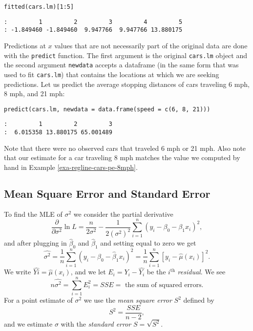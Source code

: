 \begin{verbatim}
fitted(cars.lm)[1:5]
\end{verbatim}

\begin{verbatim}
:         1         2         3         4         5 
: -1.849460 -1.849460  9.947766  9.947766 13.880175
\end{verbatim}

Predictions at \(x\) values that are not necessarily part of the
original data are done with the \texttt{predict} function. The first argument
is the original \texttt{cars.lm} object and the second argument \texttt{newdata}
accepts a dataframe (in the same form that was used to fit \texttt{cars.lm})
that contains the locations at which we are seeking predictions. Let
us predict the average stopping distances of cars traveling 6 mph, 8
mph, and 21 mph:

\begin{verbatim}
predict(cars.lm, newdata = data.frame(speed = c(6, 8, 21)))
\end{verbatim}

\begin{verbatim}
:         1         2         3 
:  6.015358 13.880175 65.001489
\end{verbatim}

Note that there were no observed cars that traveled 6 mph or 21
mph. Also note that our estimate for a car traveling 8 mph matches the
value we computed by hand in Example \ref{exa-regline-cars-pe-8mph}.

\subsection{Mean Square Error and Standard Error}
\label{sec-11-2-3}

To find the MLE of \(\sigma^{2}\) we consider the partial derivative
\begin{equation}
\frac{\partial}{\partial\sigma^{2}}\ln L=\frac{n}{2\sigma^{2}}-\frac{1}{2(\sigma^{2})^{2}}\sum_{i=1}^{n}(y_{i}-\beta_{0}-\beta_{1}x_{i})^{2},
\end{equation}
and after plugging in \(\hat{\beta}_{0}\) and \(\hat{\beta}_{1}\) and
setting equal to zero we get
\begin{equation}
\hat{\sigma^{2}}=\frac{1}{n}\sum_{i=1}^{n}(y_{i}-\hat{\beta}_{0}-\hat{\beta}_{1}x_{i})^{2}=\frac{1}{n}\sum_{i=1}^{n}[y_{i}-\hat{\mu}(x_{i})]^{2}.
\end{equation}
We write \(\hat{Yi}=\hat{\mu}(x_{i})\), and we let
\(E_{i}=Y_{i}-\hat{Y_{i}}\) be the \(i^{\mathrm{th}}\) \emph{residual}. We
see
\begin{equation}
n\hat{\sigma^{2}}=\sum_{i=1}^{n}E_{i}^{2}=SSE=\mbox{ the sum of squared errors.}
\end{equation}
For a point estimate of \(\sigma^{2}\) we use the \emph{mean square error}
\(S^{2}\) defined by
\begin{equation}
S^{2}=\frac{SSE}{n-2},
\end{equation}
and we estimate \(\sigma\) with the \emph{standard error}
\(S=\sqrt{S^{2}}\).

